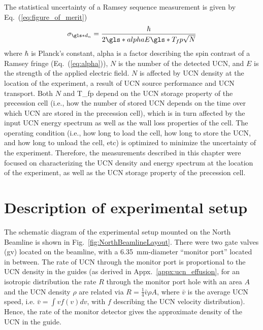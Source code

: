  The statistical uncertainty of a Ramsey sequence measurement is given by Eq.~(\ref{eq:figure_of_merit})
%
\begin{gather*}
    \sigma_{\gls*{d_n}} = \frac{\hbar}{2\gls*{alpha} E \gls*{T_fp} \sqrt{N}}
\end{gather*}
%
where $\hbar$ is Planck’s constant, \gls*{alpha} is a factor describing the spin contrast of a Ramsey fringe (Eq.~(\ref{eq:alpha})), $N$ is the number of the detected UCN, and $E$ is the strength of the applied electric field. $N$ is affected by UCN density at the location of the experiment, a result of UCN source performance and UCN transport. Both $N$ and \gls*{T_fp} depend on the UCN storage property of the precession cell (i.e., how the number of stored UCN depends on the time over which UCN are stored in the precession cell), which is in turn affected by the input UCN energy spectrum as well as the wall loss properties of the cell. The operating condition (i.e., how long to load the cell, how long to store the UCN, and how long to unload the cell, etc) is optimized to minimize the uncertainty of the experiment. Therefore, the measurements described in this chapter were focused on characterizing the UCN density and energy spectrum at the location of the experiment, as well as the UCN storage property of the precession cell. 


\section{\label{sec:northBeamlineSetup}Description of experimental setup}


The schematic diagram of the experimental setup mounted on the North Beamline is shown in Fig.~\ref{fig:NorthBeamlineLayout}. There were two gate valves (\acrshort*{gv}) located on the beamline, with a \qty{6.35}{\mm}-diameter ``monitor port'' located in between. The rate of UCN through the monitor port is proportional to the UCN density in the guides (as derived in Appx.~\ref{appx:ucn_effusion}, for an isotropic distribution the rate $R$ through the monitor port hole with an area $A$ and the UCN density $\rho$ are related via  $R = \frac{1}{4} \bar{v} \rho A$, where $\bar{v}$ is the average UCN speed, i.e. $\bar{v} = \int vf(v)dv$, with $f$ describing the UCN velocity distribution). Hence, the rate of the monitor detector gives the approximate density of the UCN in the guide.

